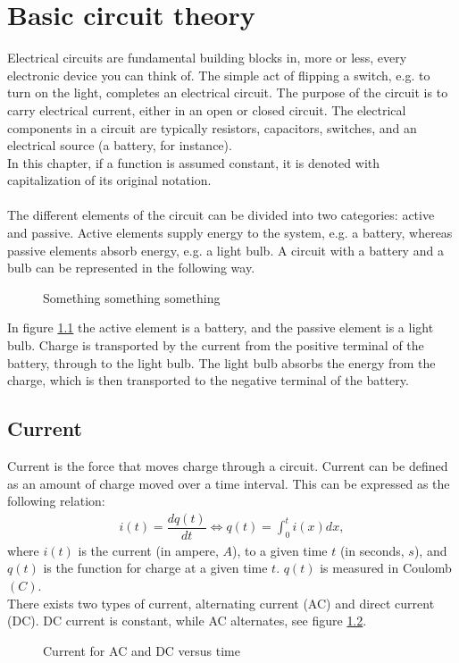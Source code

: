 \chapter{Basic circuit theory}
Electrical circuits are fundamental building blocks in, more or less, every electronic device you can think of. The simple act of flipping a switch, e.g. to turn on the light, completes an electrical circuit. The purpose of the circuit is to carry electrical current, either in an open or closed circuit. The electrical components in a circuit are typically resistors, capacitors,  switches, and an electrical 	source (a battery, for instance).
\\ 
In this chapter, if a function is assumed constant, it is denoted with capitalization of its original notation. 
\\ 
\\
The different elements of the circuit can be divided into two categories: active and passive. Active elements supply energy to the system, e.g. a battery, whereas passive elements absorb energy, e.g. a light bulb. A circuit with a battery and a bulb can be represented in the following way.
\begin{figure}[H]

\caption{Something something something}
\label{fig:bulb}
\end{figure} 
In figure \ref{fig:bulb} the active element is a battery, and the passive element is a light bulb. Charge is transported by the current from the positive terminal of the battery, through to the light bulb. The light bulb absorbs the energy from the charge, which is then transported to the negative terminal of the battery.
\\
\section{Current}
Current is the force that moves charge through a circuit. Current can be defined as an amount of charge moved over a time interval. This can be expressed as the following relation:
\begin{align}
i(t)=\dfrac{dq(t)}{dt} \Leftrightarrow q(t)=\int_{0}^{t}i(x)dx,
\end{align}
where $i(t)$ is the current (in ampere, $A$), to a given time $t$ (in seconds, $s$), and $q(t)$ is the function for charge at a given time $t$. $q(t)$ is measured in Coulomb$(C)$.
\\
There exists two types of current, alternating current (AC) and direct current (DC). DC current is constant, while AC alternates, see figure \ref{fig:ACDC}. 
\begin{figure}[H] 

\caption{Current for AC and DC versus time}
\label{fig:ACDC}
\end{figure}
